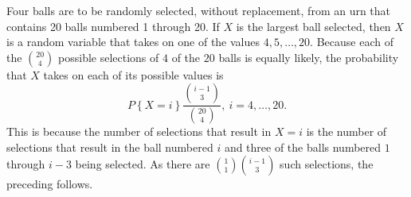 \begin{changebar}
    \begin{example}
        Four balls are to be randomly selected, without replacement, from an urn that contains 20 balls numbered 1 through 20. If $X$ is the largest ball selected, then $X$ is a random variable that takes on one of the values $4, 5, \dots, 20$. Because each of the $\displaystyle {20 \choose 4}$ possible selections of $4$ of the $20$ balls is equally likely, the probability that $X$ takes on each of its possible values is \[
            P\left\{ X = i \right\}\frac{{i - 1 \choose 3}}{{20 \choose 4}},\: i = 4, \dots, 20.    
        \] This is because the number of selections that result in $X = i$ is the number of selections that result in the ball numbered $i$ and three of the balls numbered $1$ through $i - 3$ being selected. As there are $\displaystyle {1 \choose 1}{i - 1 \choose 3}$ such selections, the preceding follows.
    \end{example}
\end{changebar}

